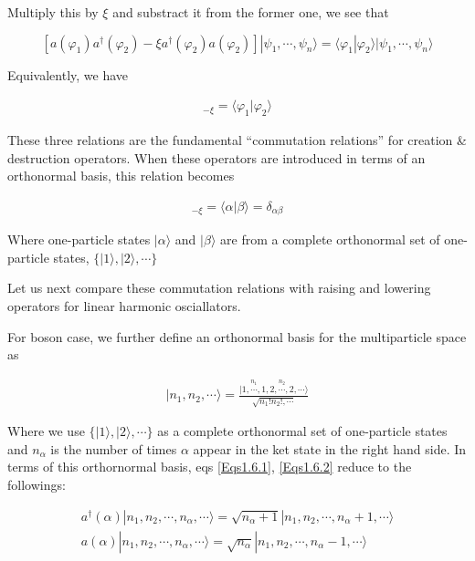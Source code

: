 ﻿\documentclass[twoside]{book}
\numberwithin{equation}{section}
\begin{document}
Multiply this by $\xi$ and substract it from the former one, we see that

\[[a(\varphi_1)a^\dagger(\varphi_2) - \xi a^\dagger(\varphi_2)a(\varphi_2)]|\psi_1,\cdots,\psi_n\rangle = \langle \varphi_1|\varphi_2\rangle |\psi_1,\cdots,\psi_n\rangle \]

Equivalently, we have

\begin{align}
[a(\varphi_1),a^\dagger(\varphi_2)] _{-\xi} = \langle\varphi_1|\varphi_2\rangle
\end{align}

These three relations are the fundamental ``commutation relations'' for creation \& destruction operators. When these operators are introduced in terms of an orthonormal basis, this relation becomes

\begin{align}
[a(\alpha),a^\dagger(\beta)]_{-\xi} = \langle\alpha|\beta\rangle = \delta_{\alpha\beta}
\end{align}

Where one-particle states $|\alpha\rangle$ and $|\beta\rangle$ are from a complete orthonormal set of one-particle states, $\{|1\rangle,|2\rangle,\cdots\}$

Let us next compare these commutation relations with raising and lowering operators for linear harmonic osciallators. 

For boson case, we further define an orthonormal basis for the multiparticle space as 

\begin{align}|n_1,n_2,\cdots\rangle = \frac{|\overset{n_1}{1,\cdots,1},\overset{n_2}{2,\cdots,2},\cdots\rangle}{\sqrt{n_1! n_2!,\cdots}} \end{align}

Where we use $\{|1\rangle,|2\rangle,\cdots\}$ as a complete orthonormal set of one-particle states and $n_{\alpha}$ is the number of times $\alpha$ appear in the ket state in the right hand side. In terms of this orthornormal basis, eqs \eqref{Eqs1.6.1}, \eqref{Eqs1.6.2} reduce to the followings:

\begin{align}
a^\dagger(\alpha)|n_1,n_2,\cdots,n_{\alpha},\cdots\rangle = \sqrt{n_\alpha+1}|n_1,n_2,\cdots,n_{\alpha}+1,\cdots\rangle\\
a(\alpha)|n_1,n_2,\cdots,n_{\alpha},\cdots\rangle = \sqrt{n_\alpha}|n_1,n_2,\cdots,n_{\alpha}-1,\cdots\rangle
\end{align}
\end{document}
